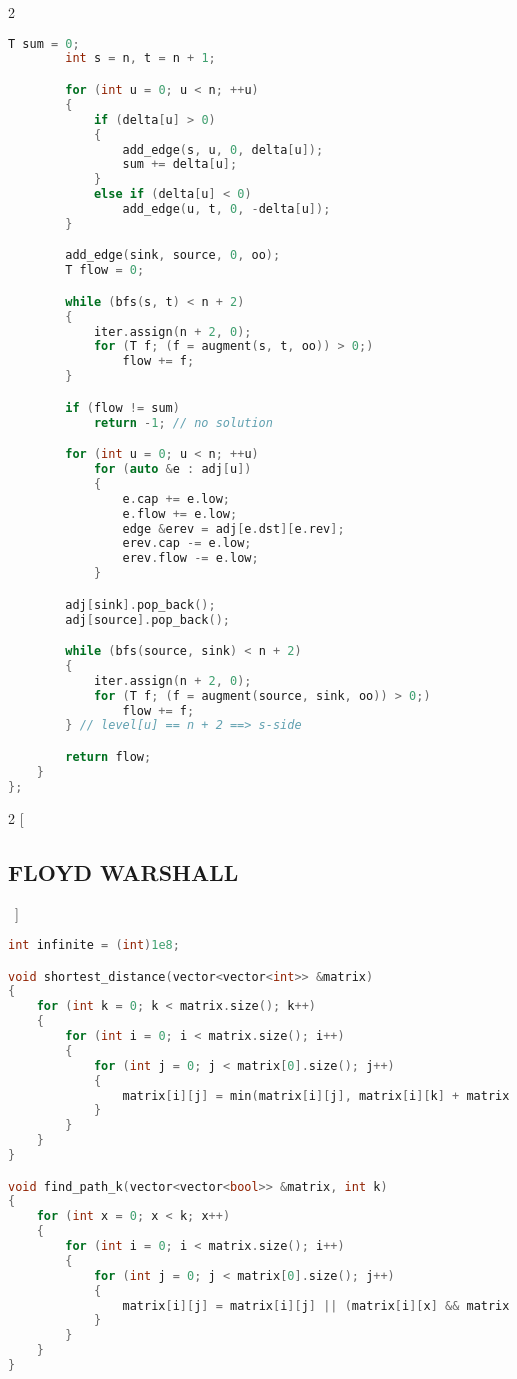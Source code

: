 \documentclass[leter]{amsart}
\begin{document}
\begin{multicols}{2}
\begin{lstlisting}[language=C++]
        T sum = 0;
        int s = n, t = n + 1;

        for (int u = 0; u < n; ++u)
        {
            if (delta[u] > 0)
            {
                add_edge(s, u, 0, delta[u]);
                sum += delta[u];
            }
            else if (delta[u] < 0)
                add_edge(u, t, 0, -delta[u]);
        }

        add_edge(sink, source, 0, oo);
        T flow = 0;

        while (bfs(s, t) < n + 2)
        {
            iter.assign(n + 2, 0);
            for (T f; (f = augment(s, t, oo)) > 0;)
                flow += f;
        }

        if (flow != sum)
            return -1; // no solution

        for (int u = 0; u < n; ++u)
            for (auto &e : adj[u])
            {
                e.cap += e.low;
                e.flow += e.low;
                edge &erev = adj[e.dst][e.rev];
                erev.cap -= e.low;
                erev.flow -= e.low;
            }

        adj[sink].pop_back();
        adj[source].pop_back();

        while (bfs(source, sink) < n + 2)
        {
            iter.assign(n + 2, 0);
            for (T f; (f = augment(source, sink, oo)) > 0;)
                flow += f;
        } // level[u] == n + 2 ==> s-side

        return flow;
    }
};


\end{lstlisting}
\end{multicols}
\begin{multicols}{2}
[\subsection{FLOYD WARSHALL}\ ]
\begin{lstlisting}[language=C++]
int infinite = (int)1e8;

void shortest_distance(vector<vector<int>> &matrix)
{
    for (int k = 0; k < matrix.size(); k++)
    {
        for (int i = 0; i < matrix.size(); i++)
        {
            for (int j = 0; j < matrix[0].size(); j++)
            {
                matrix[i][j] = min(matrix[i][j], matrix[i][k] + matrix[k][j]);
            }
        }
    }
}

void find_path_k(vector<vector<bool>> &matrix, int k)
{
    for (int x = 0; x < k; x++)
    {
        for (int i = 0; i < matrix.size(); i++)
        {
            for (int j = 0; j < matrix[0].size(); j++)
            {
                matrix[i][j] = matrix[i][j] || (matrix[i][x] && matrix[x][j]);
            }
        }
    }
}

\end{lstlisting}
\end{multicols}
\end{document}
